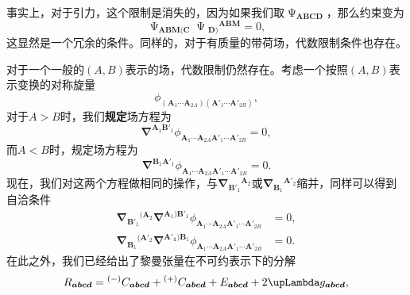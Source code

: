 事实上，对于引力，这个限制是消失的，因为如果我们取$\upPsi _{\boldsymbol{ABCD}}$，那么约束变为
\begin{equation*}
	\upPsi _{\boldsymbol{ABM}(\boldsymbol{C}} \upPsi {_{\boldsymbol{D})}}^{\boldsymbol{ABM}} =0,
\end{equation*}
这显然是一个冗余的条件。同样的，对于有质量的带荷场，代数限制条件也存在。



对于一个一般的$( A,B)$表示的场，代数限制仍然存在\parencite{christensen_new_1979,barth_arbitrary_1983}。考虑一个按照$( A,B)$表示变换的对称旋量
\begin{equation*}
	\phi _{(\boldsymbol{A}_{1} \cdots \boldsymbol{A}_{2A})(\boldsymbol{A} '_{1} \cdots \boldsymbol{A} '_{2B})} ,
\end{equation*}
对于$A >B$时，我们\textbf{规定}场方程为
\begin{equation*}
	\mathbf{\nabla }^{\boldsymbol{A}_{1}\boldsymbol{B} '_{1}} \phi _{\boldsymbol{A}_{1} \cdots \boldsymbol{A}_{2A}\boldsymbol{A} '_{1} \cdots \boldsymbol{A} '_{2B}} =0,
\end{equation*}
而$A< B$时，规定场方程为
\begin{equation*}
	\mathbf{\nabla }^{\boldsymbol{B}_{1}\boldsymbol{A} '_{1}} \phi _{\boldsymbol{A}_{1} \cdots \boldsymbol{A}_{2A}\boldsymbol{A} '_{1} \cdots \boldsymbol{A} '_{2B}} =0.
\end{equation*}
现在，我们对这两个方程做相同的操作，与$\mathbf{\nabla }{_{\boldsymbol{B} '_{1}}}^{\boldsymbol{A}_{2}}$或$\mathbf{\nabla }{_{\boldsymbol{B}_{1}}}^{\boldsymbol{A} '_{2}}$缩并，同样可以得到自洽条件
\begin{equation}
	\begin{aligned}
		\mathbf{\nabla }{_{\boldsymbol{B} '_{1}}}^{(\boldsymbol{A}_{2}}\mathbf{\nabla }^{\boldsymbol{A}_{1})\boldsymbol{B} '_{1}} \phi _{\boldsymbol{A}_{1} \cdots \boldsymbol{A}_{2A}\boldsymbol{A} '_{1} \cdots \boldsymbol{A} '_{2B}} & =0,\\
		\mathbf{\nabla }{_{\boldsymbol{B}_{1}}}^{(\boldsymbol{A} '_{2}}\mathbf{\nabla }^{\boldsymbol{A'_{1}})\boldsymbol{B}_{1}} \phi _{\boldsymbol{A}_{1} \cdots \boldsymbol{A}_{2A}\boldsymbol{A} '_{1} \cdots \boldsymbol{A} '_{2B}} & =0.
	\end{aligned}
	\label{eq:7.19}
\end{equation}
在此之外，我们已经给出了黎曼张量在不可约表示下的分解
\begin{equation*}
	R_{\boldsymbol{abcd}} =\prescript{( -)}{}{} C_{\boldsymbol{abcd}} +\prescript{( +)}{}{} C_{\boldsymbol{abcd}} +E_{\boldsymbol{abcd}} +2\upLambda g_{\boldsymbol{abcd}} ,
\end{equation*}
